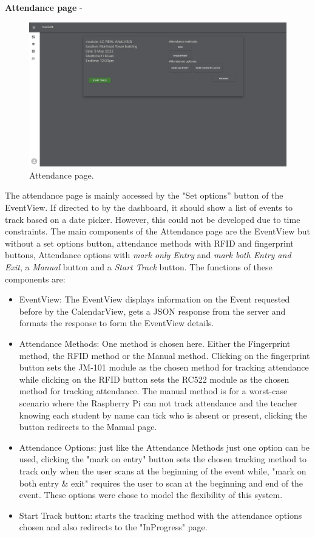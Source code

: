 \textbf{Attendance page} - 
\begin{figure}[ht!]
\includegraphics[scale=0.135]{Design & Implementation/images/Attendance.png}
\caption{Attendance page.}
\end{figure}
The attendance page is mainly accessed by the "Set options” button of the EventView. If directed to by the dashboard, it should show a list of events to track based on a date picker. However, this could not be developed due to time constraints. The main components of the Attendance page are the EventView but without a set options button, attendance methods with \gls{RFID} and fingerprint buttons, Attendance options with \textit{mark only Entry} and \textit{mark both Entry and Exit}, a \textit{Manual} button and a \textit{Start Track} button. The functions of these components are:
\begin{itemize}
\item EventView: The EventView displays information on the Event requested before by the CalendarView, gets a \gls{JSON} response from the server and formats the response to form the EventView details.
\item Attendance Methods: One method is chosen here. Either the Fingerprint method, the RFID method or the Manual method. Clicking on the fingerprint button sets the JM-101 module as the chosen method for tracking attendance while clicking on the RFID button sets the RC522 module as the chosen method for tracking attendance. The manual method is for a worst-case scenario where the Raspberry Pi can not track attendance and the teacher knowing each student by name can tick who is absent or present, clicking the button redirects to the Manual page.
\item Attendance Options: just like the Attendance Methods just one option can be used, clicking the "mark on entry" button sets the chosen tracking method to track only when the user scans at the beginning of the event while, "mark on both entry \& exit" requires the user to scan at the beginning and end of the event. These options were chose to model the flexibility of this system.
\item Start Track button: starts the tracking method with the attendance options chosen and also redirects to the "InProgress" page.
\end{itemize}

